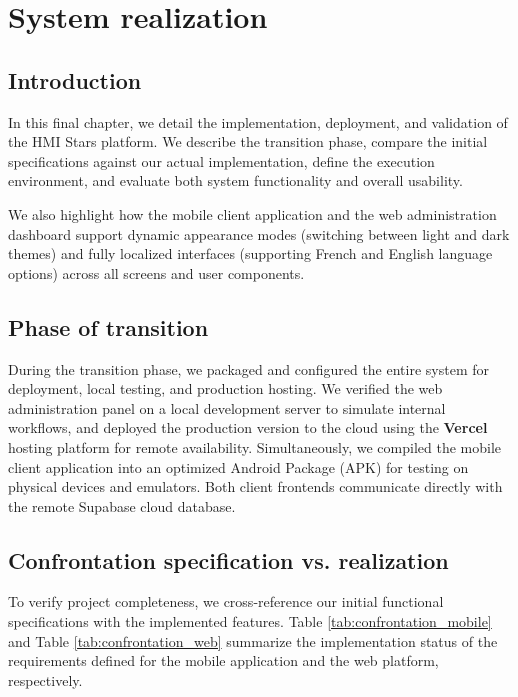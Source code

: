 \chapter{System realization}

\section{Introduction}
In this final chapter, we detail the implementation, deployment, and validation of the HMI Stars platform. We describe the transition phase, compare the initial specifications against our actual implementation, define the execution environment, and evaluate both system functionality and overall usability.

We also highlight how the mobile client application and the web administration dashboard support dynamic appearance modes (switching between light and dark themes) and fully localized interfaces (supporting French and English language options) across all screens and user components.

\section{Phase of transition}
During the transition phase, we packaged and configured the entire system for deployment, local testing, and production hosting. We verified the web administration panel on a local development server to simulate internal workflows, and deployed the production version to the cloud using the \textbf{Vercel} hosting platform for remote availability. Simultaneously, we compiled the mobile client application into an optimized Android Package (APK) for testing on physical devices and emulators. Both client frontends communicate directly with the remote Supabase cloud database.


\section{Confrontation specification vs. realization}
To verify project completeness, we cross-reference our initial functional specifications with the implemented features. Table \ref{tab:confrontation_mobile} and Table \ref{tab:confrontation_web} summarize the implementation status of the requirements defined for the mobile application and the web platform, respectively.

